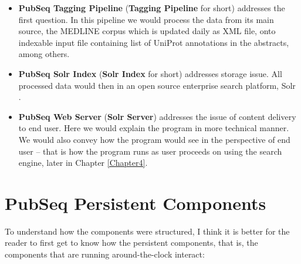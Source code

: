 \begin{itemize}
\item \textbf{PubSeq Tagging Pipeline} (\textbf{Tagging Pipeline} for short) addresses the first question. In this pipeline we would process the data from its main source, the MEDLINE corpus which is updated daily as XML file, onto indexable input file containing list of UniProt annotations in the abstracts, among others.
\item \textbf{PubSeq Solr Index} (\textbf{Solr Index} for short) addresses storage issue. All processed data would then in an open source enterprise search platform, Solr \citep{smiley2015apache}.
\item \textbf{PubSeq Web Server} (\textbf{Solr Server}) addresses the issue of content delivery to end user. Here we would explain the program in more technical manner. We would also convey how the program would see in the perspective of end user -- that is how the program runs as user proceeds on using the search engine, later in Chapter \ref{Chapter4}.
\end{itemize}


\section{PubSeq Persistent Components}

To understand how the components were structured, I think it is better for the reader to first get to know how the persistent components, that is, the components that are running around-the-clock interact:

